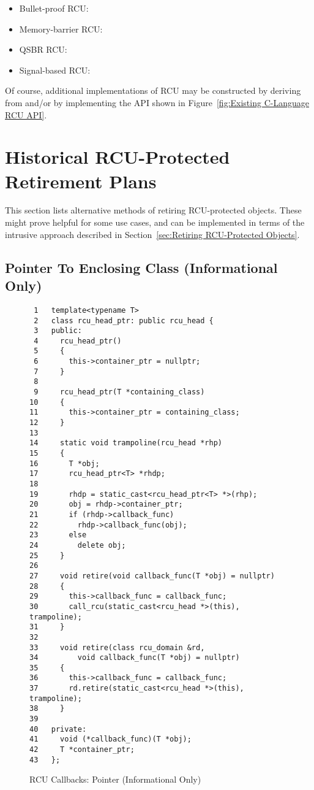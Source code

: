 \documentclass[letterpaper,10pt]{article}
\begin{document}
\begin{itemize}
\item	Bullet-proof RCU: 
\item	Memory-barrier RCU: 
\item	QSBR RCU: 
\item	Signal-based RCU: 
\end{itemize}

Of course, additional implementations of RCU may be constructed by
deriving from  and/or by implementing the API
shown in
Figure~\ref{fig:Existing C-Language RCU API}.

\section{Historical RCU-Protected Retirement Plans}
\label{fig:Historical RCU-Protected Retirement Plans}

This section lists alternative methods of retiring RCU-protected
objects.
These might prove helpful for some use cases, and can be implemented
in terms of the intrusive approach described in
Section~\ref{sec:Retiring RCU-Protected Objects}.

\subsection{Pointer To Enclosing Class (Informational Only)}
\label{sec:Pointer To Enclosing Class}

\begin{figure}[tbp]
{ \scriptsize
\begin{verbatim}
 1   template<typename T>
 2   class rcu_head_ptr: public rcu_head {
 3   public:
 4     rcu_head_ptr()
 5     {
 6       this->container_ptr = nullptr;
 7     }
 8
 9     rcu_head_ptr(T *containing_class)
10     {
11       this->container_ptr = containing_class;
12     }
13
14     static void trampoline(rcu_head *rhp)
15     {
16       T *obj;
17       rcu_head_ptr<T> *rhdp;
18
19       rhdp = static_cast<rcu_head_ptr<T> *>(rhp);
20       obj = rhdp->container_ptr;
21       if (rhdp->callback_func)
22         rhdp->callback_func(obj);
23       else
24         delete obj;
25     }
26
27     void retire(void callback_func(T *obj) = nullptr)
28     {
29       this->callback_func = callback_func;
30       call_rcu(static_cast<rcu_head *>(this), trampoline);
31     }
32
33     void retire(class rcu_domain &rd,
34         void callback_func(T *obj) = nullptr)
35     {
36       this->callback_func = callback_func;
37       rd.retire(static_cast<rcu_head *>(this), trampoline);
38     }
39
40   private:
41     void (*callback_func)(T *obj);
42     T *container_ptr;
43   };
\end{verbatim}
}
\caption{RCU Callbacks: Pointer (Informational Only)}
\label{fig:RCU Callbacks: Pointer}
\end{figure}
\end{document}
